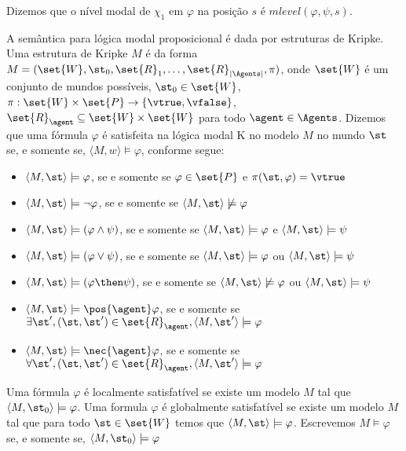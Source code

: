 Dizemos que o nível modal de $\chi_1$ em $\varphi$ na posição $s$ é $mlevel(\varphi, \psi, s)$.

A semântica para lógica modal proposicional é dada por estruturas de Kripke. Uma estrutura de Kripke $M$ é da forma $M = (\set{W}, \st_0, \set{R}_1, \ldots, \set{R}_{|\Agents|}, \pi)$, onde %
$\set{W}$ é um conjunto de mundos possíveis, $\st_0 \in \set{W}$, $\pi:\set{W} \times \set{P} \rightarrow \{\vtrue, \vfalse\}$, $\set{R}_\agent \subseteq \set{W} \times \set{W}$ para todo $\agent \in \Agents$. Dizemos que uma fórmula $\varphi$ é satisfeita na lógica modal K no modelo $M$ no mundo $\st$ se, e somente se, $\langle M,w \rangle \models \varphi$, conforme segue:

\begin{itemize}
	\item $\langle M,\st \rangle \models \varphi$, se e somente se $\varphi \in \set{P}$ e $\pi(\st, \varphi) = \vtrue$
	\item $\langle M,\st \rangle \models \neg\varphi$, se e somente se $\langle M,\st \rangle \not\models \varphi$
	\item $\langle M,\st \rangle \models (\varphi \land \psi)$, se e somente se $\langle M,\st \rangle \models \varphi$ e $\langle M,\st \rangle \models \psi $
	\item $\langle M,\st \rangle \models (\varphi \lor \psi)$, se e somente se $\langle M,\st \rangle \models \varphi$ ou $\langle M,\st \rangle \models \psi $
	\item $\langle M,\st \rangle \models (\varphi \then \psi)$, se e somente se $\langle M,\st \rangle \not\models \varphi$ ou $\langle M,\st \rangle \models \psi $
	
	\item $\langle M,\st \rangle \models \pos{\agent}\varphi$, se e somente se $\exists\st', (\st, \st') \in \set{R}_\agent, \langle M,\st' \rangle \models \varphi$
	\item $\langle M,\st \rangle \models \nec{\agent}\varphi$, se e somente se $\forall\st', (\st, \st') \in \set{R}_\agent, \langle M,\st' \rangle \models \varphi$
	
\end{itemize}

Uma fórmula $\varphi$ é localmente satisfatível se existe um modelo $M$ tal que $\langle M,\st_0 \rangle \models \varphi$. Uma formula $\varphi$ é globalmente satisfatível se existe um modelo $M$ tal que para todo $\st \in \set{W}$ temos que $\langle M,\st \rangle \models \varphi$. Escrevemos $M \models \varphi$ se, e somente se, $\langle M, \st_0 \rangle \models \varphi$

